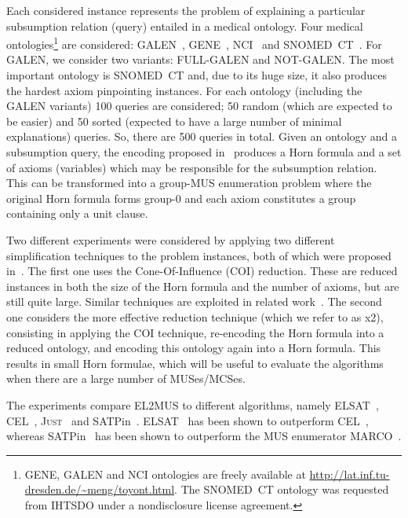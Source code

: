\documentclass{llncs}
\newcommand{\elsat}{ELSAT\xspace}
\newcommand{\just}{\textsc{Just}\xspace}
\begin{document}
Each considered instance represents the problem of explaining a particular 
subsumption relation (query) entailed in a medical ontology. Four
medical ontologies\footnote{GENE, GALEN and NCI ontologies are freely
  available at
  \url{http://lat.inf.tu-dresden.de/~meng/toyont.html}. The SNOMED~CT 
  ontology was requested from IHTSDO under a nondisclosure license
  agreement.} are considered: GALEN~\cite{rector-97}, GENE~\cite{ashburner-ng00},
NCI~\cite{sioutos-jbi07} and
SNOMED~CT~\cite{spackman-amia97}.  For GALEN, we consider two
variants: FULL-GALEN and NOT-GALEN. The most important ontology is
SNOMED~CT and, due to its huge size, it also produces the hardest
axiom pinpointing instances.
For each ontology (including the GALEN variants) 100 queries are considered; 50 random (which are expected to be easier) and 50 sorted (expected to have a large number of minimal explanations) queries. 
So, there are 500 queries in total.
Given an ontology and a subsumption query, the encoding proposed in~\cite{sebastiani-cade09,sebastiani-tr15} produces a Horn formula and a set of axioms (variables) which may be responsible for the subsumption relation. This can be transformed into a group-MUS enumeration problem where the original Horn formula forms group-0 and each axiom constitutes a group containing only a unit clause.


Two different experiments were considered by applying two 
different simplification techniques to the problem instances,
both of which were proposed in~\cite{sebastiani-tr15}. The first one uses 
the Cone-Of-Influence (COI) reduction. 
These are reduced instances in both the size of the 
Horn formula and the number of axioms, but are still quite large. 
Similar techniques are exploited in
related work~\cite{baader-ijcar06,ludwig-ore14,mp-tr15}. 
The second one considers the more effective reduction technique 
(which we refer to as x2), consisting in applying the COI technique,
re-encoding the Horn formula into a reduced ontology, and encoding
this ontology again into a Horn formula. This results in small Horn
formulae, which will be useful to evaluate the algorithms when there
are a large number of MUSes/MCSes.

The experiments compare EL2MUS to different algorithms, namely
\elsat~\cite{sebastiani-cade09,sebastiani-tr15},
CEL~\cite{baader-ijcar06}, \just~\cite{ludwig-ore14} 
and SATPin~\cite{mp-tr15}.
\elsat~\cite{sebastiani-tr15} has been shown to outperform
CEL~\cite{baader-ijcar06}, whereas SATPin~\cite{mp-tr15} has been
shown to outperform the MUS enumerator MARCO~\cite{lpmms-cj15}.
\end{document}
